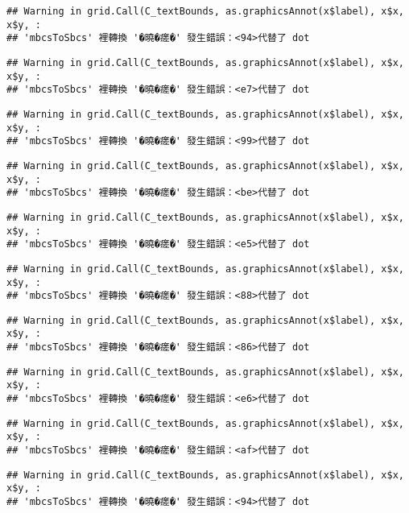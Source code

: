 \documentclass[
]{article}
\begin{document}
\begin{verbatim}
## Warning in grid.Call(C_textBounds, as.graphicsAnnot(x$label), x$x, x$y, :
## 'mbcsToSbcs' 裡轉換 '�曉�瘥�' 發生錯誤：<94>代替了 dot
\end{verbatim}

\begin{verbatim}
## Warning in grid.Call(C_textBounds, as.graphicsAnnot(x$label), x$x, x$y, :
## 'mbcsToSbcs' 裡轉換 '�曉�瘥�' 發生錯誤：<e7>代替了 dot
\end{verbatim}

\begin{verbatim}
## Warning in grid.Call(C_textBounds, as.graphicsAnnot(x$label), x$x, x$y, :
## 'mbcsToSbcs' 裡轉換 '�曉�瘥�' 發生錯誤：<99>代替了 dot
\end{verbatim}

\begin{verbatim}
## Warning in grid.Call(C_textBounds, as.graphicsAnnot(x$label), x$x, x$y, :
## 'mbcsToSbcs' 裡轉換 '�曉�瘥�' 發生錯誤：<be>代替了 dot
\end{verbatim}

\begin{verbatim}
## Warning in grid.Call(C_textBounds, as.graphicsAnnot(x$label), x$x, x$y, :
## 'mbcsToSbcs' 裡轉換 '�曉�瘥�' 發生錯誤：<e5>代替了 dot
\end{verbatim}

\begin{verbatim}
## Warning in grid.Call(C_textBounds, as.graphicsAnnot(x$label), x$x, x$y, :
## 'mbcsToSbcs' 裡轉換 '�曉�瘥�' 發生錯誤：<88>代替了 dot
\end{verbatim}

\begin{verbatim}
## Warning in grid.Call(C_textBounds, as.graphicsAnnot(x$label), x$x, x$y, :
## 'mbcsToSbcs' 裡轉換 '�曉�瘥�' 發生錯誤：<86>代替了 dot
\end{verbatim}

\begin{verbatim}
## Warning in grid.Call(C_textBounds, as.graphicsAnnot(x$label), x$x, x$y, :
## 'mbcsToSbcs' 裡轉換 '�曉�瘥�' 發生錯誤：<e6>代替了 dot
\end{verbatim}

\begin{verbatim}
## Warning in grid.Call(C_textBounds, as.graphicsAnnot(x$label), x$x, x$y, :
## 'mbcsToSbcs' 裡轉換 '�曉�瘥�' 發生錯誤：<af>代替了 dot
\end{verbatim}

\begin{verbatim}
## Warning in grid.Call(C_textBounds, as.graphicsAnnot(x$label), x$x, x$y, :
## 'mbcsToSbcs' 裡轉換 '�曉�瘥�' 發生錯誤：<94>代替了 dot
\end{verbatim}
\end{document}
